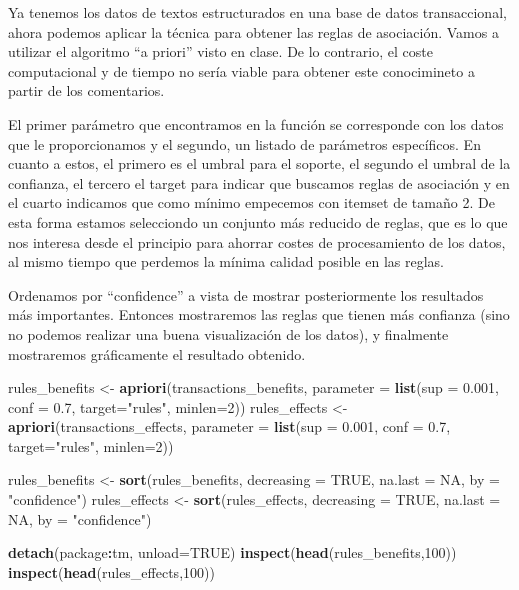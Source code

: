 \documentclass[spanish,]{article}
\newenvironment{Shaded}{\begin{snugshade}}{\end{snugshade}}
\newcommand{\KeywordTok}[1]{\textcolor[rgb]{0.13,0.29,0.53}{\textbf{#1}}}
\newcommand{\DataTypeTok}[1]{\textcolor[rgb]{0.13,0.29,0.53}{#1}}
\newcommand{\DecValTok}[1]{\textcolor[rgb]{0.00,0.00,0.81}{#1}}
\newcommand{\FloatTok}[1]{\textcolor[rgb]{0.00,0.00,0.81}{#1}}
\newcommand{\StringTok}[1]{\textcolor[rgb]{0.31,0.60,0.02}{#1}}
\newcommand{\OtherTok}[1]{\textcolor[rgb]{0.56,0.35,0.01}{#1}}
\newcommand{\OperatorTok}[1]{\textcolor[rgb]{0.81,0.36,0.00}{\textbf{#1}}}
\newcommand{\NormalTok}[1]{#1}
\begin{document}
Ya tenemos los datos de textos estructurados en una base de datos
transaccional, ahora podemos aplicar la técnica para obtener las reglas
de asociación. Vamos a utilizar el algoritmo ``a priori'' visto en
clase. De lo contrario, el coste computacional y de tiempo no sería
viable para obtener este conocimineto a partir de los comentarios.

El primer parámetro que encontramos en la función se corresponde con los
datos que le proporcionamos y el segundo, un listado de parámetros
específicos. En cuanto a estos, el primero es el umbral para el soporte,
el segundo el umbral de la confianza, el tercero el target para indicar
que buscamos reglas de asociación y en el cuarto indicamos que como
mínimo empecemos con itemset de tamaño 2. De esta forma estamos
selecciondo un conjunto más reducido de reglas, que es lo que nos
interesa desde el principio para ahorrar costes de procesamiento de los
datos, al mismo tiempo que perdemos la mínima calidad posible en las
reglas.

Ordenamos por ``confidence'' a vista de mostrar posteriormente los
resultados más importantes. Entonces mostraremos las reglas que tienen
más confianza (sino no podemos realizar una buena visualización de los
datos), y finalmente mostraremos gráficamente el resultado obtenido.

\begin{Shaded}
\begin{Highlighting}[]
\NormalTok{rules_benefits <-}\StringTok{ }\KeywordTok{apriori}\NormalTok{(transactions_benefits, }\DataTypeTok{parameter =} 
                    \KeywordTok{list}\NormalTok{(}\DataTypeTok{sup =} \FloatTok{0.001}\NormalTok{, }\DataTypeTok{conf =} \FloatTok{0.7}\NormalTok{, }\DataTypeTok{target=}\StringTok{"rules"}\NormalTok{, }\DataTypeTok{minlen=}\DecValTok{2}\NormalTok{))}
\NormalTok{rules_effects <-}\StringTok{ }\KeywordTok{apriori}\NormalTok{(transactions_effects, }\DataTypeTok{parameter =}
                    \KeywordTok{list}\NormalTok{(}\DataTypeTok{sup =} \FloatTok{0.001}\NormalTok{, }\DataTypeTok{conf =} \FloatTok{0.7}\NormalTok{, }\DataTypeTok{target=}\StringTok{"rules"}\NormalTok{, }\DataTypeTok{minlen=}\DecValTok{2}\NormalTok{))}

\NormalTok{rules_benefits <-}\StringTok{ }\KeywordTok{sort}\NormalTok{(rules_benefits, }\DataTypeTok{decreasing =} \OtherTok{TRUE}\NormalTok{, }\DataTypeTok{na.last =} \OtherTok{NA}\NormalTok{,}
                       \DataTypeTok{by =} \StringTok{"confidence"}\NormalTok{)}
\NormalTok{rules_effects <-}\StringTok{ }\KeywordTok{sort}\NormalTok{(rules_effects, }\DataTypeTok{decreasing =} \OtherTok{TRUE}\NormalTok{, }\DataTypeTok{na.last =} \OtherTok{NA}\NormalTok{,}
                      \DataTypeTok{by =} \StringTok{"confidence"}\NormalTok{)}

\KeywordTok{detach}\NormalTok{(package}\OperatorTok{:}\NormalTok{tm, }\DataTypeTok{unload=}\OtherTok{TRUE}\NormalTok{) }
\KeywordTok{inspect}\NormalTok{(}\KeywordTok{head}\NormalTok{(rules_benefits,}\DecValTok{100}\NormalTok{))}
\KeywordTok{inspect}\NormalTok{(}\KeywordTok{head}\NormalTok{(rules_effects,}\DecValTok{100}\NormalTok{))}
\end{Highlighting}
\end{Shaded}
\end{document}
